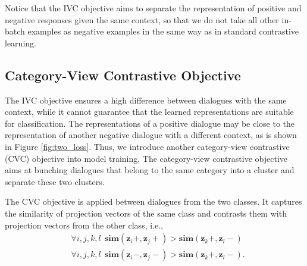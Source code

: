 \documentclass[letterpaper]{article} \usepackage{aaai22}  \usepackage{times}  \usepackage{helvet}  \usepackage{courier}  \usepackage[hyphens]{url}  \usepackage{graphicx} \urlstyle{rm} \def\UrlFont{\rm}  \usepackage{natbib}  \usepackage{caption} \DeclareCaptionStyle{ruled}{labelfont=normalfont,labelsep=colon,strut=off} \frenchspacing  \setlength{\pdfpagewidth}{8.5in}  \setlength{\pdfpageheight}{11in}  \usepackage{algorithm}
\begin{document}
Notice that the IVC objective aims to separate the representation of positive and negative responses given the same context, so that we do not take all other in-batch examples as negative examples in the same way as in standard contrastive learning.

\subsection{Category-View Contrastive Objective}
\label{sec:cat_cl}

The IVC objective ensures a high difference between dialogues with the same context, while it cannot guarantee that the learned representations are suitable for classification. The representations of a positive dialogue may be close to the representation of another negative dialogue with a different context, as is shown in Figure \ref{fig:two_loss}. Thus, we introduce another category-view contrastive (CVC) objective into model training. The category-view contrastive objective aims at bunching dialogues that belong to the same category into a cluster and separate these two clusters.

The CVC objective is applied between dialogues from the two classes. It captures the similarity of projection vectors of the same class and contrasts them with projection vectors from the other class, i.e.,
\begin{equation}
    \begin{aligned}
    & \!\! \forall{i,j,k,l} \ \ \mathbf{sim}(\mathbf{z}_i+, \mathbf{z}_j+) > \mathbf{sim}(\mathbf{z}_k+, \mathbf{z}_l-) \\
    & \!\! \forall{i,j,k,l} \ \ \mathbf{sim}(\mathbf{z}_i-, \mathbf{z}_j-) > \mathbf{sim}(\mathbf{z}_k+, \mathbf{z}_l-). \\
    \end{aligned}
\end{equation}
\end{document}
